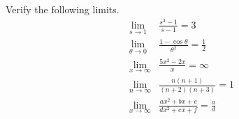 Verify the following limits.
\begin{align*}
  \lim_{s\rightarrow 1} & \frac{s^3-1}{s-1} = 3 \\
  \lim_{\theta\rightarrow 0} & \frac{1-\cos\theta}{\theta^2} = \frac{1}{2} \\
  \lim_{x\rightarrow \infty} & \frac{5x^2-2x}{x} = \infty \\
  \lim_{n\rightarrow \infty} & \frac{n(n+1)}{(n+2)(n+3)} = 1 \\
  \lim_{x\rightarrow \infty} & \frac{ax^2+bx+c}{dx^2+ex+f} = \frac{a}{d}
\end{align*}
\granville
